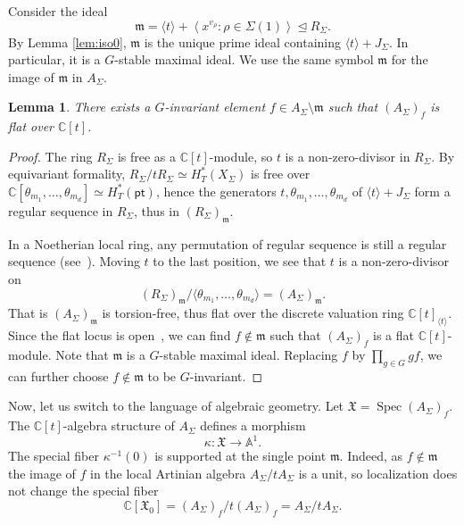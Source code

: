 \documentclass[12pt]{amsart}
\newtheorem{lemma}[theorem]{Lemma}
\theoremstyle{remark}
\begin{document}
Consider the ideal 
$$\mathfrak{m} = \langle t\rangle+\left< x^{v_\rho}:\rho\in \Sigma(1)\right>\trianglelefteq R_\Sigma.$$
By Lemma \ref{lem:iso0}, $\mathfrak{m}$ is the unique prime ideal containing $\langle t\rangle+J_\Sigma$.
In particular, it is a $G$-stable maximal ideal.
We use the same symbol $\mathfrak{m}$ for the image of $\mathfrak{m}$ in $A_\Sigma$.

\begin{lemma}There exists a $G$-invariant element $f\in A_{\Sigma}\setminus\mathfrak{m}$ such that $(A_{\Sigma})_f$ is flat over $\mathbb{C}[t]$. 
\end{lemma}
\begin{proof}
The ring $R_\Sigma$ is free as a $\mathbb{C}[t]$-module, so $t$ is a non-zero-divisor in $R_\Sigma$.
By equivariant formality, $R_\Sigma/tR_\Sigma\simeq H_T^*(X_{\Sigma})$ is free over $\mathbb{C}[\theta_{m_1},\ldots,\theta_{m_d}]\simeq H_T^*(\mathsf{pt})$,
hence the generators 
$t,\theta_{m_1},\ldots,\theta_{m_d}$
of $\langle t\rangle + J_\Sigma$ form a regular sequence in $R_\Sigma$, thus in $(R_{\Sigma})_{\mathfrak{m}}$. 

In a Noetherian local ring, any permutation of regular sequence is still a regular sequence (see~\cite[{\href{https://stacks.math.columbia.edu/tag/00LJ}{Lemma 10.68.4}}]{Stacks}). Moving $t$ to the last position, we see that $t$ is a non-zero-divisor on 
$$(R_{\Sigma})_{\mathfrak{m}}/
\langle \theta_{m_1},\ldots,\theta_{m_d}\rangle 
=(A_{\Sigma})_{\mathfrak{m}}.$$
That is $(A_\Sigma)_{\mathfrak{m}}$ is torsion-free, thus flat over the discrete valuation ring $\mathbb{C}[t]_{\langle t\rangle}$. 
Since the flat locus is open~\cite[{\href{https://stacks.math.columbia.edu/tag/0399}{Theorem 37.15.1}}]{Stacks}, we can find $f\notin \mathfrak{m}$ such that $(A_\Sigma)_f$ is a flat $\mathbb{C}[t]$-module. Note that $\mathfrak{m}$ is a $G$-stable maximal ideal. Replacing $f$ by $\prod_{g\in G} gf$, we can further choose $f\notin \mathfrak{m}$ to be $G$-invariant. 
\end{proof}

Now, let us switch to the language of algebraic geometry. 
Let $\mathfrak{X}=\operatorname{Spec}(A_\Sigma)_f$. 
The $\mathbb{C}[t]$-algebra structure of $A_\Sigma$ defines a morphism 
$$\kappa: \mathfrak{X}\longrightarrow \mathbb{A}^1. $$
The special fiber $\kappa^{-1}(0)$ is supported at the single point $\mathfrak{m}$. Indeed, as $f\notin \mathfrak{m}$
the image of $f$ in the local Artinian algebra $A_\Sigma/tA_\Sigma$ is a
unit, so localization does not change the special fiber
\begin{equation}\label{eq:central-fiber}
  \mathbb{C}[\mathfrak X_0]
  =(A_\Sigma)_f/t(A_\Sigma)_f=A_\Sigma/tA_\Sigma.
\end{equation}
\end{document}
